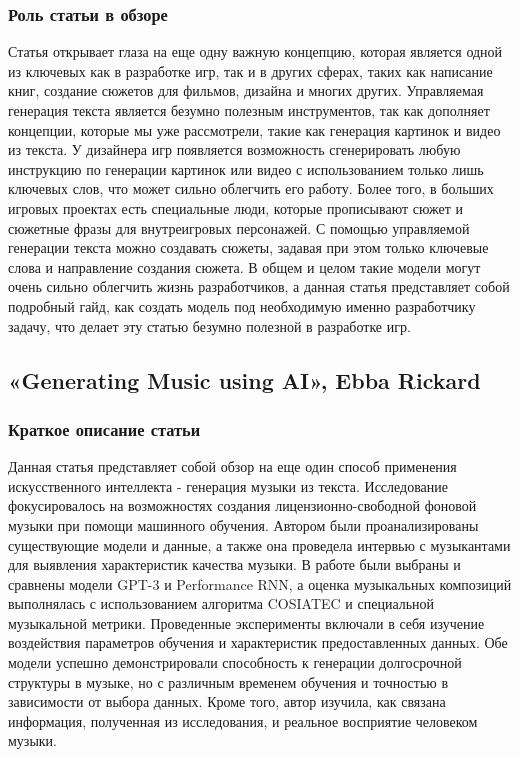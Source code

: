 \documentclass[14pt]{article}
\begin{document}
\subsubsection{Роль статьи в обзоре}
Статья открывает глаза на еще одну важную концепцию, которая является одной из ключевых как в разработке игр, так и в других сферах, таких как написание книг, создание сюжетов для фильмов, дизайна и многих других. Управляемая генерация текста является безумно полезным инструментов, так как дополняет концепции, которые мы уже рассмотрели, такие как генерация картинок и видео из текста. У дизайнера игр появляется возможность сгенерировать любую инструкцию по генерации картинок или видео с использованием только лишь ключевых слов, что может сильно облегчить его работу. Более того, в больших игровых проектах есть специальные люди, которые прописывают сюжет и сюжетные фразы для внутреигровых персонажей. С помощью управляемой генерации текста можно создавать сюжеты, задавая при этом только ключевые слова и направление создания сюжета. В общем и целом такие модели могут очень сильно облегчить жизнь разработчиков, а данная статья представляет собой подробный гайд, как создать модель под необходимую именно разработчику задачу, что делает эту статью безумно полезной в разработке игр.

\subsection{«Generating Music using AI», Ebba Rickard}
\subsubsection{Краткое описание статьи}
Данная статья представляет собой обзор на еще один способ применения искусственного интеллекта - генерация музыки из текста.
Исследование фокусировалось на возможностях создания лицензионно-свободной фоновой музыки при помощи машинного обучения. Автором были проанализированы существующие модели и данные, а также она проведела интервью с музыкантами для выявления характеристик качества музыки. В работе были выбраны и сравнены модели GPT-3 и Performance RNN, а оценка музыкальных композиций выполнялась с использованием алгоритма COSIATEC и специальной музыкальной метрики. Проведенные эксперименты включали в себя изучение воздействия параметров обучения и характеристик предоставленных данных. Обе модели успешно демонстрировали способность к генерации долгосрочной структуры в музыке, но с различным временем обучения и точностью в зависимости от выбора данных. Кроме того, автор изучила, как связана информация, полученная из исследования, и реальное восприятие человеком музыки.
\end{document}
